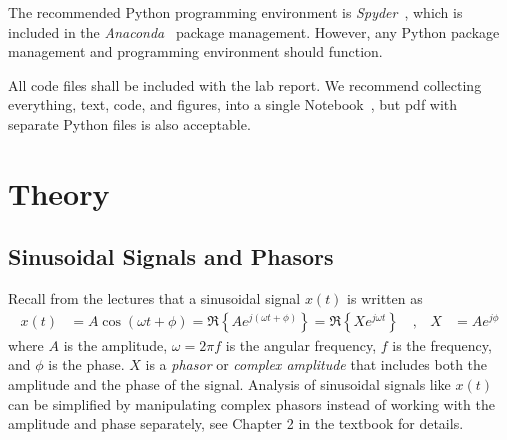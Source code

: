 The recommended Python programming environment is \emph{Spyder}~\cite{raybaut_spyder_2024}, which is included in the \emph{Anaconda}~\cite{noauthor_anaconda_2024} package management. However, any Python package management and programming environment should function.

All code files shall be included with the lab report. We recommend collecting everything, text, code, and figures, into a single \jupyterlab Notebook~\cite{project_jupyter_jupyter_nodate}, but pdf with separate Python files is also acceptable.

\afterpage{\clearpage}

\section{Theory}

\subsection{Sinusoidal Signals and Phasors}
Recall from the lectures that a sinusoidal signal $x(t)$ is written as 
\begin{align}
	x(t)&= A \cos(\omega t + \phi) = \Re\left\{ A e^{j(\omega t + \phi)} \right\} 
		=  \Re\left\{ X e^{j\omega t} \right\} \quad , &
	X &= A e^{j\phi} 
\end{align}
where $A$ is the amplitude, $\omega = 2\pi f$ is the angular frequency, $f$ is the frequency, and $\phi$ is the phase. $X$ is a \emph{phasor} or \emph{complex amplitude} that includes both the amplitude and the phase of the signal.
Analysis of sinusoidal signals like $x(t)$ can be simplified by manipulating complex phasors  instead of working with the amplitude and phase separately, see Chapter 2 in the textbook \cite{mcclellan_dsp_2016} for details.



